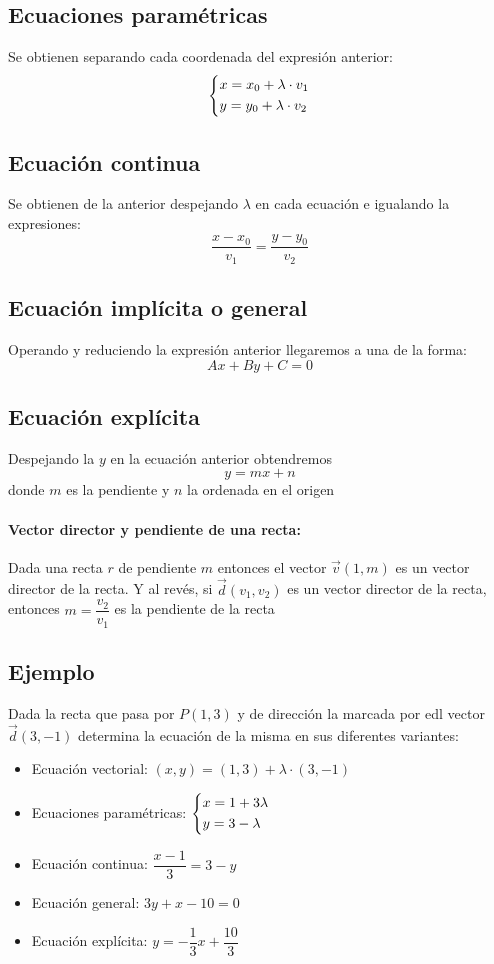\documentclass[a4paper,spanish,9pt]{extarticle}
\begin{document}
\begin{multicols*}{2}
\subsection{Ecuaciones paramétricas}
Se obtienen separando cada coordenada del expresión anterior:
$$\left\lbrace \begin{gathered}
  x = x_0 + \lambda\cdot v_1 \hfill \\
  y = y_0 + \lambda\cdot v_2 \hfill \\ 
\end{gathered}  \right.
$$
 
\subsection{Ecuación continua}
Se obtienen de la anterior despejando $\lambda$ en cada ecuación e igualando la expresiones:
$$ \dfrac{x-x_0}{v_1}=\dfrac{y-y_0}{v_2}$$

\subsection{Ecuación implícita o general}
Operando y reduciendo la expresión anterior llegaremos a una de la forma:
$$Ax+By+C=0$$

\subsection{Ecuación explícita}
Despejando la $y$ en la ecuación anterior obtendremos
$$y=mx+n$$
donde $m$ es la pendiente y $n$ la ordenada en el origen
\paragraph*{Vector director y pendiente de una recta:} 
Dada una recta $r$ de pendiente $m$ entonces el vector $\overrightarrow{v}(1,m)$ es un vector director de la recta. Y al revés, si $\overrightarrow{d}(v_1,v_2)$ es un vector director de la recta, entonces $m=\dfrac{v_2}{v_1}$ es la pendiente de la recta 

\subsection{Ejemplo}
Dada la recta que pasa por $P(1,3)$ y de dirección la marcada por edl vector $\overrightarrow{d}(3,-1)$ determina la ecuación de la misma en sus diferentes variantes:
\begin{itemize}
\item Ecuación vectorial:
$(x,y)=(1,3)+\lambda\cdot(3,-1)$
\item Ecuaciones paramétricas:
$\left\lbrace \begin{gathered}
  x = 1 + 3\lambda \hfill \\
  y = 3 - \lambda \hfill \\ 
\end{gathered}  \right.
$
\item Ecuación continua:
$\dfrac{x-1}{3}=3-y$
\item Ecuación general:
$3y+x-10=0$
\item Ecuación explícita:
$y=-\dfrac{1}{3}x+\dfrac{10}{3}$
\end{itemize}


\end{multicols*}
\end{document}
